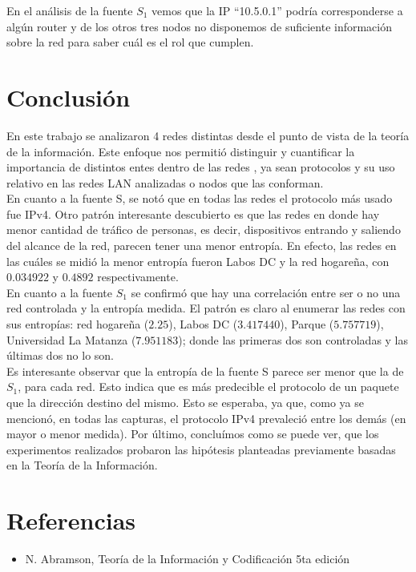 \documentclass[final,inline,narroweqnarray,a4paper]{ieee}
\begin{document}
En el análisis de la fuente $S_1$ vemos que la IP ``10.5.0.1'' podría corresponderse a algún router y de los otros tres nodos no disponemos de suficiente información sobre la red para saber cuál es el rol que cumplen.

\section{Conclusión}
\par En este trabajo se analizaron 4 redes distintas desde el punto de vista de la teoría de la información. Este enfoque nos permitió distinguir y cuantificar la importancia de distintos entes dentro de las redes , ya sean protocolos y su uso relativo en las redes LAN analizadas o nodos que las conforman. \\ 
 En cuanto a la fuente S, se notó que en todas las redes el protocolo más usado fue IPv4. Otro patrón interesante descubierto es que las redes en donde hay menor cantidad de tráfico de personas, es decir, dispositivos entrando y saliendo del alcance de la red, parecen tener una menor entropía. En efecto, las redes en las cuáles se midió la menor entropía fueron Labos DC y la red hogareña, con $0.034922$ y $0.4892$ respectivamente. \\ 
 En cuanto a la fuente $S_1$ se confirmó que hay una correlación entre ser o no una red controlada y la entropía medida. El patrón es claro al enumerar las redes con sus entropías: red hogareña ($2.25$), Labos DC ($3.417440$), Parque ($5.757719$), Universidad La Matanza ($7.951183$); donde las primeras dos son controladas y las últimas dos no lo son. \\
 Es interesante observar que la entropía de la fuente S parece ser menor que la de $S_1$, para cada red. Esto indica que es más predecible el protocolo de un paquete que la dirección destino del mismo. Esto se esperaba, ya que, como ya se mencionó, en todas las capturas, el protocolo IPv4 prevaleció entre los demás (en mayor o menor medida).
Por último, concluímos como se puede ver, que los experimentos realizados probaron las hipótesis planteadas previamente basadas en la Teoría de la Información. 
 

\section{Referencias}
	\begin{itemize}
		\item N. Abramson,
		Teoría de la Información y Codificación
		5ta edición
	\end{itemize}
\end{document}
